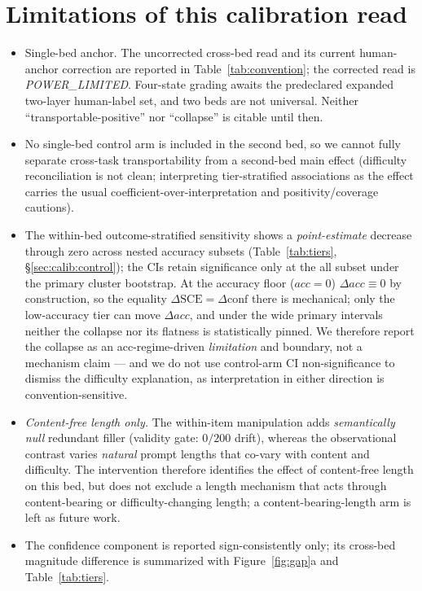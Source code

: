 \documentclass{article}
\begin{document}
\section{Limitations of this calibration read}
\begin{itemize}
\item Single-bed anchor.  The uncorrected cross-bed read and its current
human-anchor correction are reported in Table~\ref{tab:convention}; the corrected
read is \emph{POWER\_LIMITED}.  Four-state grading awaits the predeclared expanded
two-layer human-label set, and two beds are not universal.  Neither
``transportable-positive'' nor ``collapse'' is citable until then.
\item No single-bed control arm is included in the second bed, so we cannot fully separate
cross-task transportability from a second-bed main effect (difficulty reconciliation is
not clean; interpreting tier-stratified associations as the effect carries the usual
coefficient-over-interpretation \citep{westreich2013table2fallacy} and positivity/coverage
\citep{petersen2012positivity} cautions).
\item The within-bed outcome-stratified sensitivity shows a \emph{point-estimate}
decrease through zero across nested accuracy subsets (Table~\ref{tab:tiers},
\S\ref{sec:calib:control}); the CIs
retain significance only at the all subset under the primary cluster bootstrap.
At the accuracy floor ($acc{=}0$) $\Delta acc\equiv0$ by construction, so the equality
$\Delta\mathrm{SCE}=\Delta\mathrm{conf}$ there is mechanical; only the low-accuracy
tier can move $\Delta acc$, and under the wide primary intervals neither the collapse
nor its flatness is statistically pinned.  We therefore report the collapse as an
acc-regime-driven \emph{limitation} and boundary, not a mechanism claim --- and we do
not use control-arm CI non-significance to dismiss the difficulty explanation, as
interpretation in either direction is convention-sensitive.
\item \emph{Content-free length only.}  The within-item manipulation adds
\emph{semantically null} redundant filler (validity gate: $0/200$ drift), whereas
the observational contrast varies \emph{natural} prompt lengths that co-vary with
content and difficulty.  The intervention therefore identifies the effect of
content-free length on this bed, but does not exclude a length mechanism that acts
through content-bearing or difficulty-changing length; a content-bearing-length arm
is left as future work.
\item The confidence component is reported sign-consistently only; its cross-bed
magnitude difference is summarized with Figure~\ref{fig:gap}a and
Table~\ref{tab:tiers}.
\end{itemize}
\end{document}
